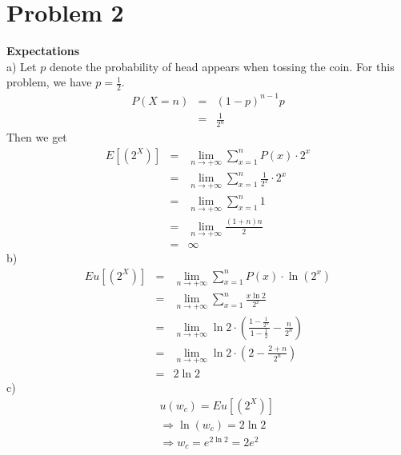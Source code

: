 \documentclass[12pt]{article}
\begin{document}
\section*{Problem 2}
{\bf Expectations} \\

a) Let $p$ denote the probability of head appears when tossing the coin. For this problem, we have $p = \frac {1}{2}$. \\
\begin{eqnarray*}
  P(X = n)
  &=& (1-p)^{n-1}p \\
  &=& \frac {1}{2^n}
\end{eqnarray*}
Then we get
\begin{eqnarray*}
  E[(2^X)]
  &=& \lim_{n \rightarrow +\infty} \sum_{x=1}^{n} P(x) \cdot 2^x \\
  &=& \lim_{n \rightarrow +\infty} \sum_{x=1}^{n} \frac {1}{2^x} \cdot 2^x \\
  &=& \lim_{n \rightarrow +\infty} \sum_{x=1}^{n} 1 \\
  &=& \lim_{n \rightarrow +\infty} \frac {(1+n)n}{2} \\
  &=& \infty
\end{eqnarray*}
b)
\begin{eqnarray*}
  Eu[(2^X)]
  &=& \lim_{n \rightarrow +\infty} \sum_{x=1}^{n} P(x) \cdot \ln(2^x) \\
  &=& \lim_{n \rightarrow +\infty} \sum_{x=1}^{n} \frac{x \ln 2}{2^x}\\
  &=& \lim_{n \rightarrow +\infty} \ln 2 \cdot
  (\frac {1 - \frac{1}{2^n}}{1 - \frac{1}{2}} - \frac{n}{2^n}) \\
  &=& \lim_{n \rightarrow +\infty} \ln 2 \cdot (2 - \frac {2+n}{2^n}) \\
  &=& 2\ln 2
\end{eqnarray*}
c)
\begin{eqnarray*}
  && u(w_c) = Eu[(2^X)] \\
  && \Rightarrow \ln (w_c) = 2 \ln 2 \\
  && \Rightarrow w_c = e^{2 \ln 2} = 2e^2
\end{eqnarray*}

 
\end{document}
